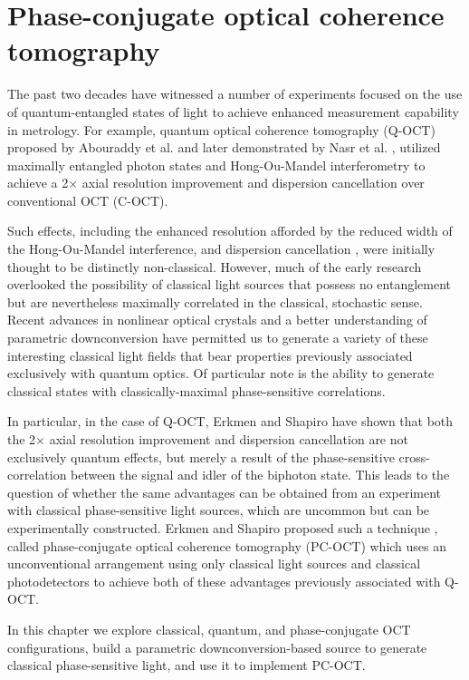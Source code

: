 \chapter{Phase-conjugate optical coherence tomography}

The past two decades have witnessed a number of experiments focused on the use of quantum-entangled states of light to achieve enhanced measurement capability in metrology. For example, quantum optical coherence tomography (Q-OCT) proposed by Abouraddy et al. \cite{abouraddy-qoct} and later demonstrated by Nasr et al. \cite{nasr-qoct}, utilized maximally entangled photon states and Hong-Ou-Mandel interferometry \cite{hong-interference} to achieve a 2$\times$ axial resolution improvement and dispersion cancellation over conventional OCT (C-OCT).

Such effects, including the enhanced resolution afforded by the reduced width of the Hong-Ou-Mandel interference, and dispersion cancellation \cite{steinberg-dispersion,franson-dispersion}, were initially thought to be distinctly non-classical. However, much of the early research overlooked the possibility of classical light sources that possess no entanglement but are nevertheless maximally correlated in the classical, stochastic sense. Recent advances in nonlinear optical crystals and a better understanding of parametric downconversion have permitted us to generate a variety of these interesting classical light fields that bear properties previously associated exclusively with quantum optics. Of particular note is the ability to generate classical states with classically-maximal phase-sensitive correlations.

In particular, in the case of Q-OCT, Erkmen and Shapiro \cite{erkmen-pcoct} have shown that both the 2$\times$ axial resolution improvement and dispersion cancellation are not exclusively quantum effects, but merely a result of the phase-sensitive cross-correlation between the signal and idler of the biphoton state. This leads to the question of whether the same advantages can be obtained from an experiment with classical phase-sensitive light sources, which are uncommon but can be experimentally constructed. Erkmen and Shapiro proposed such a technique \cite{erkmen-pcoct}, called phase-conjugate optical coherence tomography (PC-OCT) which uses an unconventional arrangement using only classical light sources and classical photodetectors to achieve both of these advantages previously associated with Q-OCT.

In this chapter we explore classical, quantum, and phase-conjugate OCT configurations, build a parametric downconversion-based source to generate classical phase-sensitive light, and use it to implement PC-OCT.

